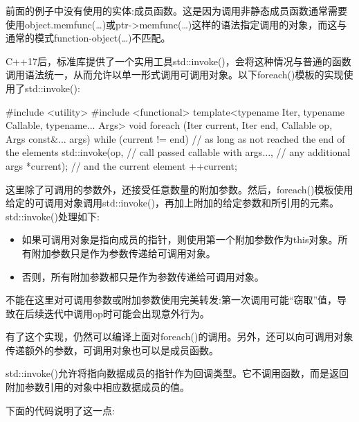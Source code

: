 前面的例子中没有使用的实体:成员函数。这是因为调用非静态成员函数通常需要使用object.memfunc(…)或ptr->memfunc(…)这样的语法指定调用的对象，而这与通常的模式function-object(…)不匹配。

C++17后，标准库提供了一个实用工具std::invoke()，会将这种情况与普通的函数调用语法统一，从而允许以单一形式调用可调用对象。以下foreach()模板的实现使用了std::invoke():

\begin{cpp}
#include <utility>
#include <functional>
template<typename Iter, typename Callable, typename... Args>
void foreach (Iter current, Iter end, Callable op, Args const&... args)
{
	while (current != end) { // as long as not reached the end of the elements
		std::invoke(op, // call passed callable with
					args..., // any additional args
					*current); // and the current element
		++current;
	}
}
\end{cpp}

这里除了可调用的参数外，还接受任意数量的附加参数。然后，foreach()模板使用给定的可调用对象调用std::invoke()，再加上附加的给定参数和所引用的元素。std::invoke()处理如下:

\begin{itemize}
\item
如果可调用对象是指向成员的指针，则使用第一个附加参数作为this对象。所有附加参数只是作为参数传递给可调用对象。

\item
否则，所有附加参数都只是作为参数传递给可调用对象。
\end{itemize}

不能在这里对可调用参数或附加参数使用完美转发:第一次调用可能“窃取”值，导致在后续迭代中调用op时可能会出现意外行为。

有了这个实现，仍然可以编译上面对foreach()的调用。另外，还可以向可调用对象传递额外的参数，可调用对象也可以是成员函数。

\begin{notice}std::invoke()允许将指向数据成员的指针作为回调类型。它不调用函数，而是返回附加参数引用的对象中相应数据成员的值。
\end{notice}

下面的代码说明了这一点:

